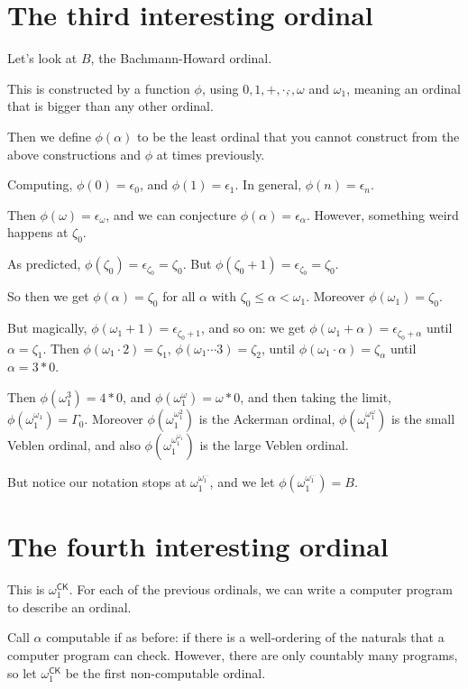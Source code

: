 \documentclass[12pt]{article}
\begin{document}
\section{The third interesting ordinal}

Let's look at $B$, the Bachmann-Howard ordinal.

This is constructed by a function $\phi$, using $0, 1, + , \cdot, \hat{}, \omega$ and $\omega_1$, meaning an ordinal that is bigger than any other ordinal.

Then we define $\phi(\alpha)$ to be the least ordinal that you cannot construct from the above constructions and $\phi$ at times previously.

Computing, $\phi(0) = \epsilon_0$, and $\phi(1) = \epsilon_1$. In general, $\phi(n) = \epsilon_n$.

Then $\phi(\omega) = \epsilon_{\omega}$, and we can conjecture $\phi(\alpha) = \epsilon_{\alpha}$. However, something weird happens at $\zeta_0$.

As predicted, $\phi(\zeta_0) = \epsilon_{\zeta_0} = \zeta_0$. But $\phi(\zeta_0+1) = \epsilon_{\zeta_0} = \zeta_0$.

So then we get $\phi(\alpha) = \zeta_0$ for all $\alpha$ with $\zeta_0 \leq \alpha < \omega_1$. Moreover $\phi(\omega_1) = \zeta_0$.

But magically, $\phi(\omega_1 + 1) = \epsilon_{\zeta_0 + 1}$, and so on: we get $\phi(\omega_1 + \alpha) = \epsilon_{\zeta_0 + \alpha}$ until $\alpha = \zeta_1$. Then $\phi(\omega_1 \cdot 2) = \zeta_1$, $\phi(\omega_1 \cdots 3)= \zeta_2$, until $\phi(\omega_1 \cdot \alpha) = \zeta_{\alpha}$ until $\alpha = 3 \ast 0$.

Then $\phi(\omega_1^{3}) = 4 \ast 0$, and $\phi(\omega_1^{\omega}) = \omega \ast 0$, and then taking the limit, $\phi(\omega_1^{\omega_1}) = \Gamma_0$. Moreover $\phi(\omega_1^{\omega_1^2})$ is the Ackerman ordinal, $\phi(\omega_1^{\omega_1^{\omega}})$ is the small Veblen ordinal, and also $\phi(\omega_1^{\omega_1^{\omega_1}})$ is the large Veblen ordinal.

But notice our notation stops at $\omega_1^{\omega_1^{\cdots}}$, and we let $\phi(\omega_1^{\omega_1^{\cdots}}) = B$.

\section{The fourth interesting ordinal}

This is $\omega_1^{\mathsf{CK}}$. For each of the previous ordinals, we can write a computer program to describe an ordinal.

Call $\alpha$ computable if as before: if there is a well-ordering of the naturals that a computer program can check. However, there are only countably many programs, so let $\omega_1^{\mathsf{CK}}$ be the first non-computable ordinal.
\end{document}
